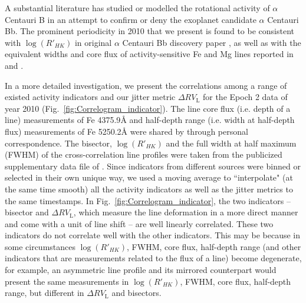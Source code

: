 A substantial literature has studied or modelled the rotational activity of $\alpha$ Centauri B in an attempt to confirm or deny the exoplanet candidate $\alpha$ Centauri Bb. The prominent periodicity in 2010 that we present is found to be consistent with $\log (R'_{HK})$ in original $\alpha$ Centauri Bb discovery paper \cite{Dumusque_Centauri_B}, as well as with the equivalent widths and core flux of activity-sensitive Fe and Mg lines reported in \cite{Thompson2017MNRAS} and \cite{Wise2018}. 

In a more detailed investigation, we present the correlations among a range of existed activity indicators and our jitter metric $\Delta RV_\text{L}$ for the Epoch 2 data of year 2010 (Fig.~\ref{fig:Correlogram_indicator}). The line core flux (i.e. depth of a line) measurements of Fe 4375.9{\AA} and half-depth range (i.e. width at half-depth flux) measurements of Fe 5250.2{\AA} were shared by \cite{Wise2018} through personal correspondence. The bisector, $\log (R'_{HK})$ and the full width at half maximum (FWHM) of the cross-correlation line profiles were taken from the publicized supplementary data file of \cite{Dumusque_Centauri_B}. Since indicators from different sources were binned or selected in their own unique way, we used a moving average to ``interpolate" (at the same time smooth) all the activity indicators as well as the jitter metrics to the same timestamps. In Fig.~\ref{fig:Correlogram_indicator}, the two indicators -- bisector and $\Delta RV_\text{L}$, which measure the line deformation in a more direct manner and come with a unit of line shift -- are well linearly correlated. These two indicators do not correlate well with the other indicators. This may be because in some circumstances $\log (R'_{HK})$, FWHM, core flux, half-depth range (and other indicators that are measurements related to the flux of a line) become degenerate, for example, an asymmetric line profile and its mirrored counterpart would present the same measurements in $\log (R'_{HK})$, FWHM, core flux, half-depth range, but different in $\Delta RV_\text{L}$ and bisectors.

